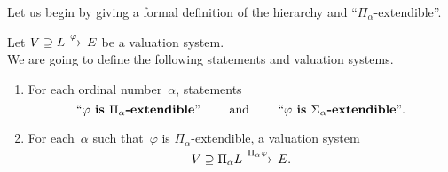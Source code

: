 Let us begin by giving a formal definition
of the hierarchy
and ``$\Pi_\alpha$-extendible''.
\begin{dfn}
\label{P:hier}
Let $V \supseteq L\,\smash{\xrightarrow{\varphi}\,E}$
be a valuation system.\\
We are going to define the following
statements and valuation systems.
\begin{enumerate}
\item \label{hier:first-cond}
For each ordinal number~$\alpha$,
statements
\begin{equation*}
\text{``\textbf{$\varphi$ is $\Pi_\alpha$-extendible}''}
\qquad\text{ and }\qquad
\text{``\textbf{$\varphi$ is $\Sigma_\alpha$-extendible}''}.
\end{equation*}
\item
For each~$\alpha$ such that~$\varphi$ 
is $\Pi_\alpha$-extendible,
a valuation system 
\begin{equation*}
V \supseteq \Pi_\alpha L\,\smash{\xrightarrow{\Pi_\alpha \varphi}\,E}.
\end{equation*}


\end{enumerate}
\end{dfn}
